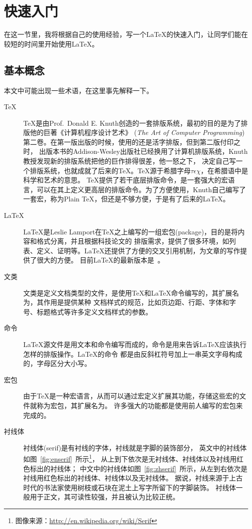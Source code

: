 
\section{快速入门}
在这一节里，我将根据自己的使用经验，写一个\LaTeX{}的快速入门，让同学们能在较短的时间里开始使用\LaTeX{}。
\subsection{基本概念}
本文中可能出现一些术语，在这里事先解释一下。
\begin{description}
\item[\TeX] \TeX{}是由Prof.~Donald E. Knuth创造的一套排版系统，最初的目的是为了排版他的巨著《计算机程序设计艺术》
(\emph{The Art of Computer Programming})第二卷。在第一版出版的时候，使用的还是活字排版，但到第二版付印之时，
出版本书的Addison-Wesley出版社已经换用了计算机排版系统，Knuth教授发现新的排版系统把他的巨作排得很差，他一怒之下，
决定自己写一个排版系统，也就成就了后来的\TeX{}。\TeX{}源于希腊字母$\tau\epsilon\chi$，在希腊语中是科学和艺术的意思。
\TeX{}提供了若干底层排版命令，是一套强大的宏语言，可以在其上定义更高层的排版命令。为了方便使用，Knuth自己编写了
一套宏，称为Plain \TeX{}，但还是不够方便，于是有了后来的\LaTeX{}。

\item[\LaTeX] \LaTeX{}是Leslie Lamport在\TeX{}之上编写的一组宏包(package)，目的是将内容和格式分离，并且根据科技论文的
排版需求，提供了很多环境，如列表、定义、证明等。\LaTeX{}还提供了方便的交叉引用机制，为文章的写作提供了很大的方便。
目前\LaTeX{}的最新版本是~\LaTeXe{}。

\item[文类] 文类是定义文档类型的文件，是使用\TeX{}和\LaTeX{}命令编写的，其扩展名为，其作用是提供某种
文档样式的规范，比如页边距、行距、字体和字号、标题格式等许多定义文档样式的参数。

\item[命令] \LaTeX{}源文件是用文本和命令编写而成的，命令是用来告诉\LaTeX{}应该执行怎样的排版操作。\LaTeX{}的命令
都是由反斜杠符号\cmd{\textbackslash}加上一串英文字母构成的，字母区分大小写。

\item[宏包] 由于\TeX{}是一种宏语言，从而可以通过宏定义扩展其功能，存储这些宏的文件就称为宏包，其扩展名为。
许多强大的功能都是使用前人编写的宏包来完成的。

\item[衬线体] 衬线体(serif)是有衬线的字体，衬线就是字脚的装饰部分，
英文中的衬线体如图~\ref{fig:enserif}~所示\footnote{图像来源：\url{http://en.wikipedia.org/wiki/Serif}}，
从上到下依次是无衬线体、衬线体以及衬线用红色标出的衬线体；
中文中的衬线体如图~\ref{fig:zhserif}~所示，从左到右依次是衬线用红色标出的衬线体、衬线体以及无衬线体。
据说，衬线来源于上古时代的书法家使用树枝或石块在泥土上写字所留下的字脚装饰。
衬线体一般用于正文，其可读性较强，并且被认为比较正统。


\end{description}
